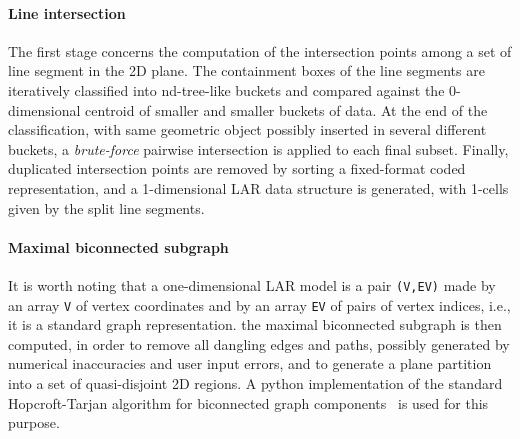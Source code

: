 \documentclass[]{egpubl}
\begin{document}
\paragraph*{Line intersection}\label{intersection-of-lines-and-graph-generation}
The first stage concerns the computation of the
intersection points among a set of line segment in the 2D plane. The
containment boxes of the line segments are iteratively classified into nd-tree-like buckets and compared against the 0-dimensional centroid of smaller and smaller buckets of
data.
At the end of the classification, with same geometric object possibly
inserted in several different buckets, a \emph{brute-force} pairwise intersection
is applied to each final subset. Finally, duplicated intersection
points are removed by sorting a fixed-format coded representation, and a 1-dimensional LAR data structure is generated,
with 1-cells given by the split line segments.

\paragraph*{Maximal biconnected
subgraph}\label{computation-of-the-maximal-biconnected-subgraph}
It is worth noting that a one-dimensional LAR model is a pair \texttt{(V,EV)} made by an array \texttt{V} of vertex coordinates and by an array \texttt{EV} of pairs of vertex indices, i.e., it is a standard graph representation. the maximal biconnected subgraph is then computed, in order to remove all dangling edges and paths, possibly generated by numerical inaccuracies and user input errors, and to generate a plane partition into a set of quasi-disjoint 2D regions. A python  implementation of the standard Hopcroft-Tarjan algorithm for biconnected graph components~\cite{Hopcroft:1973:AEA:362248.362272} is used for this purpose.
\end{document}
